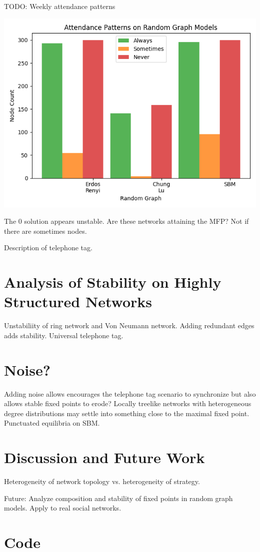 \documentclass[12pt]{article}
\begin{document}
TODO: Weekly attendance patterns

\begin{center}
\includegraphics[scale=0.7]{always_sometimes_never.png}
\end{center}
The 0 solution appears unstable.  Are these networks attaining the MFP?  Not if there are sometimes nodes.

Description of telephone tag.

\section{Analysis of Stability on Highly Structured Networks}

Unstabiliity of ring network and Von Neumann network.  Adding redundant edges adds stability.  Universal telephone tag.

\section{Noise?}
Adding noise allows encourages the telephone tag scenario to synchronize but also allows stable fixed points to erode?  Locally treelike networks with heterogeneous degree distributions may settle into something close to the maximal fixed point.  Punctuated equilibria on SBM.

\section{Discussion and Future Work}
Heterogeneity of network topology vs. heterogeneity of strategy.

Future: Analyze composition and stability of fixed points in random graph models.  Apply to real social networks.

\section*{Code}
\end{document}
